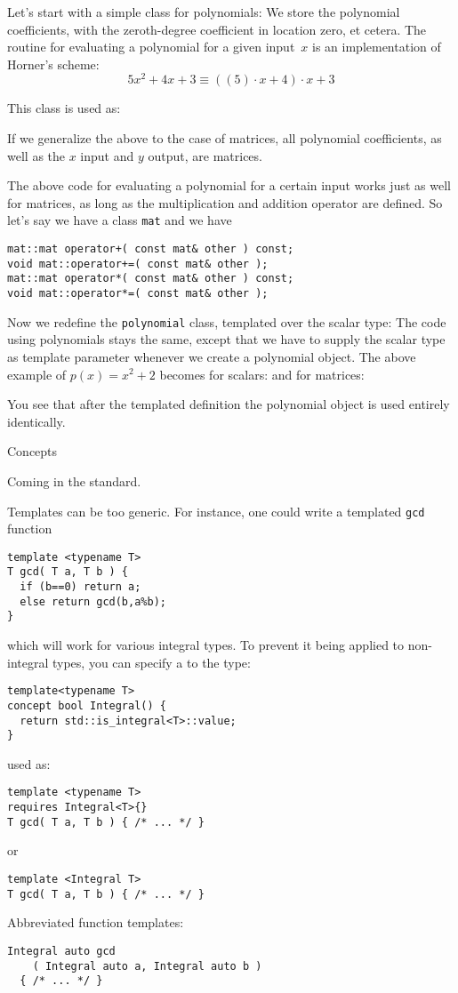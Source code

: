 Let's start with a simple class for polynomials:
%
%
We store the polynomial coefficients, with the
zeroth-degree coefficient in location zero, et cetera.
The routine for evaluating a polynomial for a given input~$x$
is an implementation of Horner's scheme:
\[ 5 x^2 +4x +3 \equiv ( ( 5 ) \cdot x + 4 ) \cdot x + 3 \]

This class is used as:
%

If we generalize the above to the case of matrices,
all polynomial coefficients, as well as the $x$ input and $y$ output,
are matrices.

The above code for evaluating a polynomial for a certain input
works just as well for matrices, as long as the multiplication and
addition operator are defined.
So let's say we have a class \lstinline{mat} and we have
\begin{lstlisting}
mat::mat operator+( const mat& other ) const;
void mat::operator+=( const mat& other );
mat::mat operator*( const mat& other ) const;
void mat::operator*=( const mat& other );
\end{lstlisting}

Now we redefine the \lstinline{polynomial} class,
templated over the scalar type:
%
%
The code using polynomials stays the same, except that we
have to supply the scalar type as template parameter
whenever we create a polynomial object.
The above example of $p(x)=x^2+2$ becomes
for scalars:
%
%
and for matrices:
%

You see that after the templated definition
the polynomial object is used entirely identically.

 {Concepts}
\label{sec:cpp-concepts}

Coming in the  standard.

Templates can be too generic. For instance, one could write a
templated \lstinline{gcd} function
\begin{lstlisting}
template <typename T>
T gcd( T a, T b ) {
  if (b==0) return a;
  else return gcd(b,a%b);
}
\end{lstlisting}
which will work for various integral types. To prevent it being
applied to non-integral types, you can specify a 
to the type:
\begin{lstlisting}
template<typename T>
concept bool Integral() {
  return std::is_integral<T>::value;
}
\end{lstlisting}
used as:
\begin{lstlisting}
template <typename T>
requires Integral<T>{}
T gcd( T a, T b ) { /* ... */ }
\end{lstlisting}
or
\begin{lstlisting}
template <Integral T>
T gcd( T a, T b ) { /* ... */ }
\end{lstlisting}
Abbreviated function templates:
\begin{lstlisting}
Integral auto gcd
    ( Integral auto a, Integral auto b )
  { /* ... */ }
\end{lstlisting}

